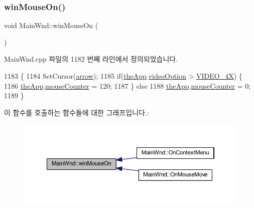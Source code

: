 \mbox{\label{class_main_wnd_aadc325bab367045adb1258609f8f2c9e}} 
\subsubsection{\texorpdfstring{win\+Mouse\+On()}{winMouseOn()}}
{\footnotesize\ttfamily void Main\+Wnd\+::win\+Mouse\+On (\begin{DoxyParamCaption}{ }\end{DoxyParamCaption})}



Main\+Wnd.\+cpp 파일의 1182 번째 라인에서 정의되었습니다.


\begin{DoxyCode}
1183 \{
1184   SetCursor(\mbox{\hyperlink{class_main_wnd_aacb2a400730b1e95ee16792acd6a089f}{arrow}});
1185   \textcolor{keywordflow}{if}(\mbox{\hyperlink{_v_b_a_8cpp_a8095a9d06b37a7efe3723f3218ad8fb3}{theApp}}.\mbox{\hyperlink{class_v_b_a_a17dac073149c897f770c00ed7098ad32}{videoOption}} > \mbox{\hyperlink{_v_b_a_8h_a531c35e38ede3ea4e5ba5afb24b29493a6468bce6b84e6350d3de126f257eb38d}{VIDEO\_4X}}) \{
1186     \mbox{\hyperlink{_v_b_a_8cpp_a8095a9d06b37a7efe3723f3218ad8fb3}{theApp}}.\mbox{\hyperlink{class_v_b_a_af042fea29b45069293e90bef70c7839a}{mouseCounter}} = 120;
1187   \} \textcolor{keywordflow}{else}
1188     \mbox{\hyperlink{_v_b_a_8cpp_a8095a9d06b37a7efe3723f3218ad8fb3}{theApp}}.\mbox{\hyperlink{class_v_b_a_af042fea29b45069293e90bef70c7839a}{mouseCounter}} = 0;
1189 \}
\end{DoxyCode}
이 함수를 호출하는 함수들에 대한 그래프입니다.\+:
\nopagebreak
\begin{figure}[H]
\begin{center}
\leavevmode
\includegraphics[width=350pt]{class_main_wnd_aadc325bab367045adb1258609f8f2c9e_icgraph}
\end{center}
\end{figure}
\mbox{\label{class_main_wnd_ab71924a5be91bd6193c6ea19ddd3d483}} 
